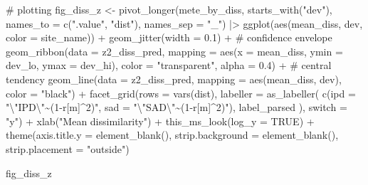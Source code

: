 \documentclass[
  letterpaper,
  DIV=11,
  numbers=noendperiod]{scrartcl}
\newenvironment{Shaded}{\begin{snugshade}}{\end{snugshade}}
\newcommand{\AttributeTok}[1]{\textcolor[rgb]{0.40,0.45,0.13}{#1}}
\newcommand{\CommentTok}[1]{\textcolor[rgb]{0.37,0.37,0.37}{#1}}
\newcommand{\ConstantTok}[1]{\textcolor[rgb]{0.56,0.35,0.01}{#1}}
\newcommand{\FloatTok}[1]{\textcolor[rgb]{0.68,0.00,0.00}{#1}}
\newcommand{\FunctionTok}[1]{\textcolor[rgb]{0.28,0.35,0.67}{#1}}
\newcommand{\NormalTok}[1]{\textcolor[rgb]{0.00,0.23,0.31}{#1}}
\newcommand{\OtherTok}[1]{\textcolor[rgb]{0.00,0.23,0.31}{#1}}
\newcommand{\SpecialCharTok}[1]{\textcolor[rgb]{0.37,0.37,0.37}{#1}}
\newcommand{\StringTok}[1]{\textcolor[rgb]{0.13,0.47,0.30}{#1}}
\begin{document}
\begin{Shaded}
\begin{Highlighting}[]
\CommentTok{\# plotting}
\NormalTok{fig\_diss\_z }\OtherTok{\textless{}{-}} \FunctionTok{pivot\_longer}\NormalTok{(mete\_by\_diss, }\FunctionTok{starts\_with}\NormalTok{(}\StringTok{"dev"}\NormalTok{), }
                           \AttributeTok{names\_to =} \FunctionTok{c}\NormalTok{(}\StringTok{".value"}\NormalTok{, }\StringTok{"dist"}\NormalTok{), }
                           \AttributeTok{names\_sep =} \StringTok{"\_"}\NormalTok{) }\SpecialCharTok{|\textgreater{}} 
    \FunctionTok{ggplot}\NormalTok{(}\FunctionTok{aes}\NormalTok{(mean\_diss, dev, }\AttributeTok{color =}\NormalTok{ site\_name)) }\SpecialCharTok{+}
    \FunctionTok{geom\_jitter}\NormalTok{(}\AttributeTok{width =} \FloatTok{0.1}\NormalTok{) }\SpecialCharTok{+}
    \CommentTok{\# confidence envelope}
    \FunctionTok{geom\_ribbon}\NormalTok{(}\AttributeTok{data =}\NormalTok{ z2\_diss\_pred, }
                \AttributeTok{mapping =} \FunctionTok{aes}\NormalTok{(}\AttributeTok{x =}\NormalTok{ mean\_diss, }
                              \AttributeTok{ymin =}\NormalTok{ dev\_lo, }
                              \AttributeTok{ymax =}\NormalTok{ dev\_hi), }
                \AttributeTok{color =} \StringTok{"transparent"}\NormalTok{, }\AttributeTok{alpha =} \FloatTok{0.4}\NormalTok{) }\SpecialCharTok{+}
    \CommentTok{\# central tendency }
    \FunctionTok{geom\_line}\NormalTok{(}\AttributeTok{data =}\NormalTok{ z2\_diss\_pred, }
              \AttributeTok{mapping =} \FunctionTok{aes}\NormalTok{(mean\_diss, dev), }
              \AttributeTok{color =} \StringTok{"black"}\NormalTok{) }\SpecialCharTok{+}
    \FunctionTok{facet\_grid}\NormalTok{(}\AttributeTok{rows =} \FunctionTok{vars}\NormalTok{(dist), }
               \AttributeTok{labeller =} \FunctionTok{as\_labeller}\NormalTok{(}
                   \FunctionTok{c}\NormalTok{(}\AttributeTok{ipd =} \StringTok{"}\SpecialCharTok{\textbackslash{}"}\StringTok{IPD}\SpecialCharTok{\textbackslash{}"}\StringTok{\textasciitilde{}(1{-}r[m]\^{}2)"}\NormalTok{, }
                     \AttributeTok{sad =} \StringTok{"}\SpecialCharTok{\textbackslash{}"}\StringTok{SAD}\SpecialCharTok{\textbackslash{}"}\StringTok{\textasciitilde{}(1{-}r[m]\^{}2)"}\NormalTok{),}
\NormalTok{                   label\_parsed}
\NormalTok{               ), }
               \AttributeTok{switch =} \StringTok{"y"}\NormalTok{) }\SpecialCharTok{+}
    \FunctionTok{xlab}\NormalTok{(}\StringTok{"Mean dissimilarity"}\NormalTok{) }\SpecialCharTok{+}
    \FunctionTok{this\_ms\_look}\NormalTok{(}\AttributeTok{log\_y =} \ConstantTok{TRUE}\NormalTok{) }\SpecialCharTok{+}
    \FunctionTok{theme}\NormalTok{(}\AttributeTok{axis.title.y =} \FunctionTok{element\_blank}\NormalTok{(),}
          \AttributeTok{strip.background =} \FunctionTok{element\_blank}\NormalTok{(), }
          \AttributeTok{strip.placement =} \StringTok{"outside"}\NormalTok{)}

\NormalTok{fig\_diss\_z}
\end{Highlighting}
\end{Shaded}
\end{document}
